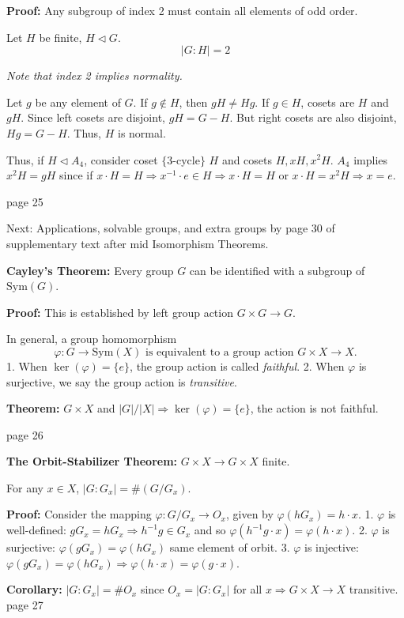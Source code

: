 \documentclass{article}
\begin{document}
\textbf{Proof:} Any subgroup of index 2 must contain all elements of odd order.

Let $H$ be finite, $H \triangleleft G$.
\[
|G : H| = 2
\]

\textit{Note that index 2 implies normality.}

Let $g$ be any element of $G$. If $g \notin H$, then $gH \neq Hg$. If $g \in H$, cosets are $H$ and $gH$. Since left cosets are disjoint, $gH = G - H$. But right cosets are also disjoint, $Hg = G - H$. Thus, $H$ is normal.

Thus, if $H \triangleleft A_4$, consider coset $\{3$-cycle$\}$ $H$ and cosets $H, xH, x^2H$. $A_4$ implies $x^2H = gH$ since if $x \cdot H = H \Rightarrow x^{-1} \cdot e \in H \Rightarrow x \cdot H = H$ or $x \cdot H = x^2H \Rightarrow x = e$. 

\newpage
\noindent page 25

Next: Applications, solvable groups, and extra groups by page 30 of supplementary text after mid Isomorphism Theorems.

\textbf{Cayley's Theorem:} Every group $G$ can be identified with a subgroup of $\text{Sym}(G)$.

\textbf{Proof:} This is established by left group action $G \times G \to G$.

In general, a group homomorphism
\[
\varphi: G \to \text{Sym}(X) \text{ is equivalent to a group action } G \times X \to X.
\]
1. When $\ker(\varphi) = \{ e \}$, the group action is called \textit{faithful}.
2. When $\varphi$ is surjective, we say the group action is \textit{transitive}.

\textbf{Theorem:} $G \times X$ and $\left|G\right| / \left|X\right| \Rightarrow \ker(\varphi) = \{ e \}$, the action is not faithful.

\newpage
\noindent page 26

\textbf{The Orbit-Stabilizer Theorem:} $G \times X \to G \times X$ finite.

For any $x \in X$, $|G : G_x| = \#(G / G_x)$.

\textbf{Proof:} Consider the mapping $\varphi: G / G_x \to O_x$, given by $\varphi(h G_x) = h \cdot x$.
1. $\varphi$ is well-defined: $g G_x = h G_x \Rightarrow h^{-1}g \in G_x$ and so $\varphi(h^{-1}g \cdot x) = \varphi(h \cdot x)$.
2. $\varphi$ is surjective: $\varphi(g G_x) = \varphi(h G_x)$ same element of orbit.
3. $\varphi$ is injective: $\varphi(g G_x) = \varphi(h G_x) \Rightarrow \varphi(h \cdot x) = \varphi(g \cdot x)$.

\textbf{Corollary:} $|G : G_x| = \# O_x$ since $O_x = |G : G_x|$ for all $x \Rightarrow G \times X \to X$ transitive.
\newpage
\noindent page 27
\end{document}
